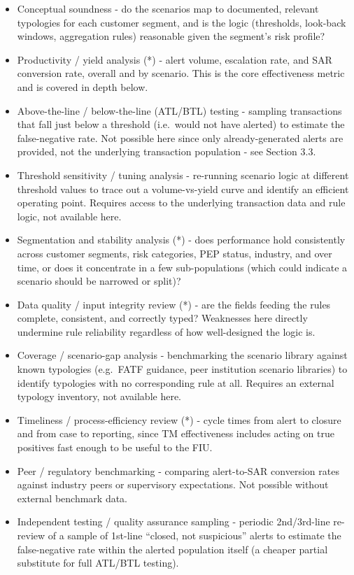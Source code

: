 \documentclass[
]{article}
\begin{document}
\begin{itemize}
\item
  Conceptual soundness - do the scenarios map to documented, relevant
  typologies for each customer segment, and is the logic (thresholds,
  look-back windows, aggregation rules) reasonable given the segment's
  risk profile?
\item
  Productivity / yield analysis (*) - alert volume, escalation rate, and
  SAR conversion rate, overall and by scenario. This is the core
  effectiveness metric and is covered in depth below.
\item
  Above-the-line / below-the-line (ATL/BTL) testing - sampling
  transactions that fall just below a threshold (i.e.~would not have
  alerted) to estimate the false-negative rate. Not possible here since
  only already-generated alerts are provided, not the underlying
  transaction population - see Section 3.3.
\item
  Threshold sensitivity / tuning analysis - re-running scenario logic at
  different threshold values to trace out a volume-vs-yield curve and
  identify an efficient operating point. Requires access to the
  underlying transaction data and rule logic, not available here.
\item
  Segmentation and stability analysis (*) - does performance hold
  consistently across customer segments, risk categories, PEP status,
  industry, and over time, or does it concentrate in a few
  sub-populations (which could indicate a scenario should be narrowed or
  split)?
\item
  Data quality / input integrity review (*) - are the fields feeding the
  rules complete, consistent, and correctly typed? Weaknesses here
  directly undermine rule reliability regardless of how well-designed
  the logic is.
\item
  Coverage / scenario-gap analysis - benchmarking the scenario library
  against known typologies (e.g.~FATF guidance, peer institution
  scenario libraries) to identify typologies with no corresponding rule
  at all. Requires an external typology inventory, not available here.
\item
  Timeliness / process-efficiency review (*) - cycle times from alert to
  closure and from case to reporting, since TM effectiveness includes
  acting on true positives fast enough to be useful to the FIU.
\item
  Peer / regulatory benchmarking - comparing alert-to-SAR conversion
  rates against industry peers or supervisory expectations. Not possible
  without external benchmark data.
\item
  Independent testing / quality assurance sampling - periodic
  2nd/3rd-line re-review of a sample of 1st-line ``closed, not
  suspicious'' alerts to estimate the false-negative rate within the
  alerted population itself (a cheaper partial substitute for full
  ATL/BTL testing).
\end{itemize}
\end{document}
